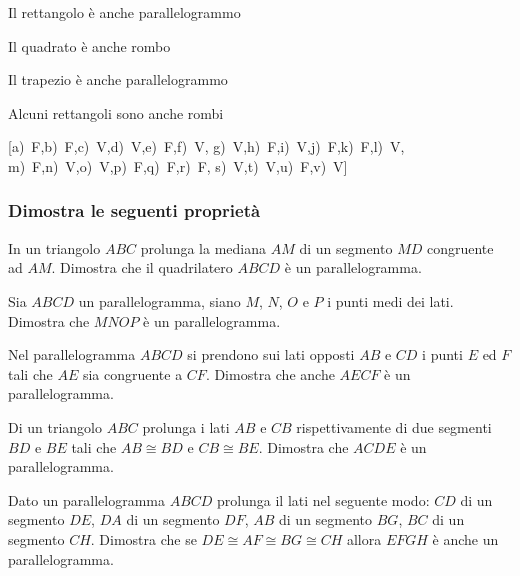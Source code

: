 \begin{esercizio}
\begin{enumeratea}
\item Il rettangolo è anche parallelogrammo\hfill\boxV\quad\boxF
\item Il quadrato è anche rombo\hfill\boxV\quad\boxF
\item Il trapezio è anche parallelogrammo\hfill\boxV\quad\boxF
\item Alcuni rettangoli sono anche rombi\hfill\boxV\quad\boxF
\end{enumeratea}
\hfill[a)~F,\quad b)~F,\quad c)~V,\quad d)~V,\quad e)~F,\quad f)~V,\quad 
g)~V,\quad h)~F,\quad i)~V,\quad j)~F,\quad k)~F,\quad l)~V,\quad 
m)~F,\quad n)~V,\quad o)~V,\quad p)~F,\quad q)~F,\quad r)~F,\quad 
s)~V,\quad t)~V,\quad u)~F,\quad v)~V]
\end{esercizio}

\begin{multicols}{2}

\subsubsection*{Dimostra le seguenti proprietà}

\begin{esercizio}
	\label{ese:4.10}
	In un triangolo \(ABC\) prolunga la mediana \(AM\) di un segmento \(MD\) 
	congruente ad \(AM\). Dimostra che il quadrilatero \(ABCD\) è un 
	parallelogramma.
\end{esercizio}

\begin{esercizio}
	\label{ese:4.11}
	Sia \(ABCD\) un parallelogramma, siano \(M\), \(N\), \(O\) e \(P\) i punti medi 
	dei lati. Dimostra che \(MNOP\) è un parallelogramma.
\end{esercizio}

\begin{esercizio}
	\label{ese:4.13}
	Nel parallelogramma \(ABCD\) si prendono sui lati opposti \(AB\) e \(CD\) i 
	punti \(E\) ed \(F\) tali che \(AE\) sia congruente a \(CF\). Dimostra che 
	anche \(AECF\) è un parallelogramma.
\end{esercizio}

\begin{esercizio}
	\label{ese:4.14}
	Di un triangolo \(ABC\) prolunga i lati \(AB\) e \(CB\) rispettivamente di 
	due segmenti \(BD\) e \(BE\) tali che \(AB\cong BD\) e \(CB\cong BE\). 
	Dimostra che \(ACDE\) è un parallelogramma.
\end{esercizio}

\begin{esercizio}
	\label{ese:4.17}
	Dato un parallelogramma \(ABCD\) prolunga il lati nel seguente modo: 
	\(CD\) di un segmento \(DE\), \(DA\) di un segmento \(DF\), \(AB\) di un 
	segmento \(BG\), \(BC\) di un segmento \(CH\). Dimostra che se \(DE\cong 
	AF\cong BG\cong CH\) allora \(EFGH\) è anche un parallelogramma.
\end{esercizio}


\end{multicols}
